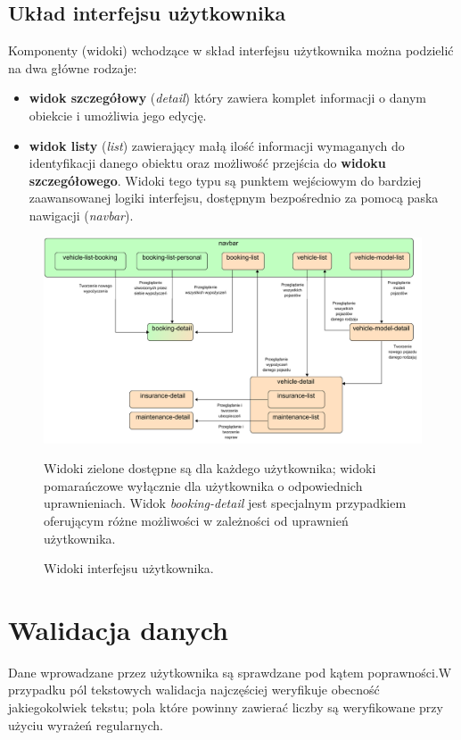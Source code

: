 \documentclass[eng,printmode,openany]{mgr}
\begin{document}
	\subsection{Układ interfejsu użytkownika}
	Komponenty (widoki) wchodzące w skład interfejsu użytkownika można podzielić na dwa główne rodzaje:
	\begin{itemize}
		\item \textbf{widok szczegółowy} (\textit{detail}) który zawiera komplet informacji o danym obiekcie i umożliwia jego edycję.
		\item \textbf{widok listy} (\textit{list}) zawierający małą ilość informacji wymaganych do identyfikacji danego obiektu oraz możliwość przejścia do \textbf{widoku szczegółowego}. Widoki tego typu są punktem wejściowym do bardziej zaawansowanej logiki interfejsu, dostępnym bezpośrednio za pomocą paska nawigacji (\textit{navbar}).
	\end{itemize}
	\begin{figure}[H]
		\centering
		\includegraphics[width=\textwidth]{images/angular_views.png}
		\caption{Widoki interfejsu użytkownika.}
		\small 
		Widoki zielone dostępne są dla każdego użytkownika; widoki pomarańczowe wyłącznie dla użytkownika o odpowiednich uprawnieniach. Widok \textit{booking-detail} jest specjalnym przypadkiem oferującym różne możliwości w zależności od uprawnień użytkownika.
	\end{figure}

	\section{Walidacja danych}
	Dane wprowadzane przez użytkownika są sprawdzane pod kątem poprawności.W przypadku pól tekstowych walidacja najczęściej weryfikuje obecność jakiegokolwiek tekstu; pola które powinny zawierać liczby są weryfikowane przy użyciu wyrażeń regularnych.
	
\end{document}
